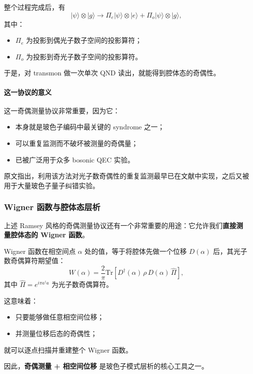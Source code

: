 \documentclass[12pt,a4paper,oneside]{ctexbook}
\begin{document}
整个过程完成后，有
\begin{equation}
|\psi\rangle\otimes |g\rangle
\longrightarrow
\Pi_e|\psi\rangle\otimes |e\rangle
+
\Pi_o|\psi\rangle\otimes |g\rangle,
\tag{89}
\end{equation}
其中：
\begin{itemize}
    \item \(\Pi_e\) 为投影到偶光子数子空间的投影算符；
    \item \(\Pi_o\) 为投影到奇光子数子空间的投影算符。
\end{itemize}

于是，对 transmon 做一次单次 QND 读出，就能得到腔体态的奇偶性。

\paragraph{这一协议的意义}
这一奇偶测量协议非常重要，因为它：
\begin{itemize}
    \item 本身就是玻色子编码中最关键的 syndrome 之一；
    \item 可以重复监测而不破坏被测量的奇偶量；
    \item 已被广泛用于众多 bosonic QEC 实验。
\end{itemize}

原文指出，利用该方法对光子数奇偶性的重复监测最早已在文献中实现，之后又被用于大量玻色子量子纠错实验。

\subsubsection{Wigner 函数与腔体态层析}

上述 Ramsey 风格的奇偶测量协议还有一个非常重要的用途：它允许我们\textbf{直接测量腔体态的 Wigner 函数}。

Wigner 函数在相空间点 \(\alpha\) 处的值，等于将腔体先做一个位移 \(D(\alpha)\) 后，其光子数奇偶算符期望值：
\[
W(\alpha)
=
\frac{2}{\pi}
\mathrm{Tr}\!\left[
D^\dagger(\alpha)\,\rho\,D(\alpha)\,\hat{\Pi}
\right],
\]
其中 \(\hat{\Pi}=e^{i\pi a^\dagger a}\) 为光子数奇偶算符。

这意味着：
\begin{itemize}
    \item 只要能够做任意相空间位移；
    \item 并测量位移后态的奇偶性；
\end{itemize}
就可以逐点扫描并重建整个 Wigner 函数。

因此，\textbf{奇偶测量 + 相空间位移} 是玻色子模式层析的核心工具之一。
\end{document}
